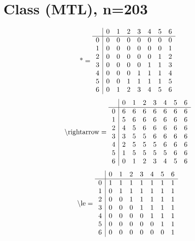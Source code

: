 \documentclass[11pt]{article}
\begin{document}
\section{Class (MTL), n=203}
\[\text{*} = 
\begin{array}{r | r r r r r r r}
 & 0 & 1 & 2 & 3 & 4 & 5 & 6 \\ \hline
0 & 0 & 0 & 0 & 0 & 0 & 0 & 0 \\
1 & 0 & 0 & 0 & 0 & 0 & 0 & 1 \\
2 & 0 & 0 & 0 & 0 & 0 & 1 & 2 \\
3 & 0 & 0 & 0 & 0 & 1 & 1 & 3 \\
4 & 0 & 0 & 0 & 1 & 1 & 1 & 4 \\
5 & 0 & 0 & 1 & 1 & 1 & 1 & 5 \\
6 & 0 & 1 & 2 & 3 & 4 & 5 & 6 \\
\end{array}
\]
\[\text{\textbackslash rightarrow} = 
\begin{array}{r | r r r r r r r}
 & 0 & 1 & 2 & 3 & 4 & 5 & 6 \\ \hline
0 & 6 & 6 & 6 & 6 & 6 & 6 & 6 \\
1 & 5 & 6 & 6 & 6 & 6 & 6 & 6 \\
2 & 4 & 5 & 6 & 6 & 6 & 6 & 6 \\
3 & 3 & 5 & 5 & 6 & 6 & 6 & 6 \\
4 & 2 & 5 & 5 & 5 & 6 & 6 & 6 \\
5 & 1 & 5 & 5 & 5 & 5 & 6 & 6 \\
6 & 0 & 1 & 2 & 3 & 4 & 5 & 6 \\
\end{array}
\]
\[\text{\textbackslash le} = 
\begin{array}{r | r r r r r r r}
 & 0 & 1 & 2 & 3 & 4 & 5 & 6 \\ \hline
0 & 1 & 1 & 1 & 1 & 1 & 1 & 1 \\
1 & 0 & 1 & 1 & 1 & 1 & 1 & 1 \\
2 & 0 & 0 & 1 & 1 & 1 & 1 & 1 \\
3 & 0 & 0 & 0 & 1 & 1 & 1 & 1 \\
4 & 0 & 0 & 0 & 0 & 1 & 1 & 1 \\
5 & 0 & 0 & 0 & 0 & 0 & 1 & 1 \\
6 & 0 & 0 & 0 & 0 & 0 & 0 & 1 \\
\end{array}
\]
\end{document}
